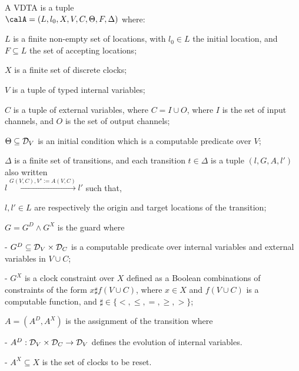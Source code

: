 %
\begin{definition}
	\label{def:ptav}
	A {VDTA} is a tuple \\
	$\calA = \left(L, {l_0}, X, V, C, \Theta, F,  \Delta \right)$ where:
	\squishlist
	\item $L$ is a finite non-empty set of locations, with $l_0 \in L$ the initial location, and $F \subseteq L$ the set of accepting locations;
	\item $X$ is a finite set of discrete clocks;
	\item $V$ is a tuple of typed internal variables; 
	\item $C$ is a tuple of external variables, where $C = I \cup O$, where $I$ is the set of input channels, and $O$ is the set of output channels; 
	\item $\Theta\subseteq {\cal D}_{V }$ is an initial condition which is a computable predicate over $V$;
	\item $\Delta$ is a finite set of transitions, and each transition $t \in \Delta$ is a tuple $( l, G, A, l' )$
	also written\\
	$l \xrightarrow{G(V,C), V':=A(V,C)} l'$
	such that,
	\squishlist
	\item[\textbullet] $l, l' \in L$ are respectively the origin and target locations of the transition;
	\item[\textbullet] $G = G^D \wedge G^X$ is the guard where
	\squishlist
	\item[-] $G^D \subseteq {\cal D}_V \times {\cal D}_{C}$
	is a computable predicate over internal variables and external variables  in $V \cup C$;
	\item[-] $G^X$ is a clock constraint over $X$ defined as a Boolean combinations of constraints of the form $x \sharp f(V \cup C)$, where $x \in X$ and $f(V \cup C)$ is a computable function, and $\sharp \in \{ <, \leq, =, \geq, > \}$;
	\squishend
	\item[\textbullet] $A$$=$$(A^D, A^X)$ is the assignment of the transition where
	\squishlist
	\item[-] $A^D :{\cal D}_V \times {\cal D}_{C} \rightarrow {\cal D}_V$ defines the evolution of internal variables.
	\item[-] $A^X \subseteq X$ is the set of clocks to be reset.
	\squishend
	\squishend
	\squishend
\end{definition}
%

